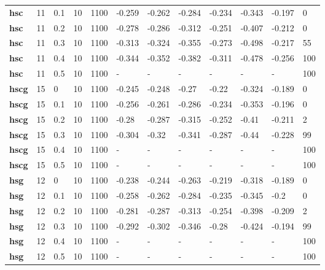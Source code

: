 \begin{longtable}[h]{|p{0.8cm}|p{1.5cm}|p{1cm}|p{1cm}|p{1cm}|p{1cm}|p{1cm}|p{1cm}|p{1cm}|p{1cm}|p{1cm}|p{1.5cm}|}
           \\
  \textbf{hsc } &  11         & 0.1 & 10 & 1100 & -0.259 & -0.262 & -0.284 & -0.234 & -0.343 & -0.197 &   0
           \\
  \textbf{hsc } &  11         & 0.2 & 10 & 1100 & -0.278 & -0.286 & -0.312 & -0.251 & -0.407 & -0.212 &   0
           \\
  \textbf{hsc } &  11         & 0.3 & 10 & 1100 & -0.313 & -0.324 & -0.355 & -0.273 & -0.498 & -0.217 &  55
           \\
  \textbf{hsc } &  11         & 0.4 & 10 & 1100 & -0.344 & -0.352 & -0.382 & -0.311 & -0.478 & -0.256 & 100
           \\
  \textbf{hsc } &  11         & 0.5 & 10 & 1100 & - & - & - & - & - & - & 100
           \\
  \textbf{hscg} &  15         &   0 & 10 & 1100 & -0.245 & -0.248 &  -0.27 &  -0.22 & -0.324 & -0.189 &   0
           \\
  \textbf{hscg} &  15         & 0.1 & 10 & 1100 & -0.256 & -0.261 & -0.286 & -0.234 & -0.353 & -0.196 &   0
           \\
  \textbf{hscg} &  15         & 0.2 & 10 & 1100 &  -0.28 & -0.287 & -0.315 & -0.252 &  -0.41 & -0.211 &   2
           \\
  \textbf{hscg} &  15         & 0.3 & 10 & 1100 & -0.304 &  -0.32 & -0.341 & -0.287 &  -0.44 & -0.228 &  99
           \\
  \textbf{hscg} &  15         & 0.4 & 10 & 1100 & - & - & - & - & - & - & 100
           \\
  \textbf{hscg} &  15         & 0.5 & 10 & 1100 & - & - & - & - & - & - & 100
           \\
  \textbf{hsg } &  12         &   0 & 10 & 1100 & -0.238 & -0.244 & -0.263 & -0.219 & -0.318 & -0.189 &   0
           \\
  \textbf{hsg } &  12         & 0.1 & 10 & 1100 & -0.258 & -0.262 & -0.284 & -0.235 & -0.345 &   -0.2 &   0
           \\
  \textbf{hsg } &  12         & 0.2 & 10 & 1100 & -0.281 & -0.287 & -0.313 & -0.254 & -0.398 & -0.209 &   2
           \\
  \textbf{hsg } &  12         & 0.3 & 10 & 1100 & -0.292 & -0.302 & -0.346 &  -0.28 & -0.424 & -0.194 &  99
           \\
  \textbf{hsg } &  12         & 0.4 & 10 & 1100 & - & - & - & - & - & - & 100
           \\
  \textbf{hsg } &  12         & 0.5 & 10 & 1100 & - & - & - & - & - & - & 100
           \\
 \end{longtable}
